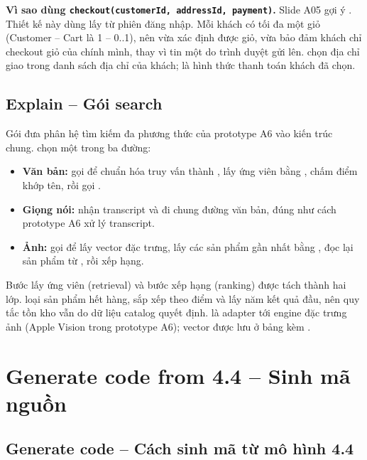 \documentclass[12pt,a4paper]{article}
\begin{document}
\textbf{Vì sao dùng \texttt{checkout(customerId, addressId, payment)}.} Slide A05 gợi ý
. Thiết kế này dùng  lấy từ phiên đăng
nhập. Mỗi khách có tối đa một giỏ (Customer -- Cart là 1 -- 0..1), nên  vừa xác định
được giỏ, vừa bảo đảm khách chỉ checkout giỏ của chính mình, thay vì tin một  do trình
duyệt gửi lên.  chọn địa chỉ giao trong danh sách địa chỉ của khách;  là
hình thức thanh toán khách đã chọn.

\subsection{Explain -- Gói search}

Gói  đưa phân hệ tìm kiếm đa phương thức của prototype A6 vào
kiến trúc chung.  chọn một trong ba đường:
\begin{itemize}
\item \textbf{Văn bản:}  gọi  để chuẩn
hóa truy vấn thành , lấy ứng viên bằng , chấm điểm
khớp tên, rồi gọi .
\item \textbf{Giọng nói:}  nhận transcript và đi chung đường văn bản, đúng như cách
prototype A6 xử lý transcript.
\item \textbf{Ảnh:}  gọi  để lấy vector đặc trưng, lấy các sản
phẩm gần nhất bằng , đọc lại sản phẩm từ , rồi xếp hạng.
\end{itemize}
Bước lấy ứng viên (retrieval) và bước xếp hạng (ranking) được tách thành hai lớp. 
loại sản phẩm hết hàng, sắp xếp theo điểm và lấy năm kết quả đầu, nên quy tắc tồn kho vẫn do dữ liệu
catalog quyết định.  là adapter tới engine đặc trưng ảnh (Apple Vision trong
prototype A6); vector được lưu ở bảng  kèm .

\section{Generate code from 4.4 -- Sinh mã nguồn}\label{sec:45}

\subsection{Generate code -- Cách sinh mã từ mô hình 4.4}
\end{document}
